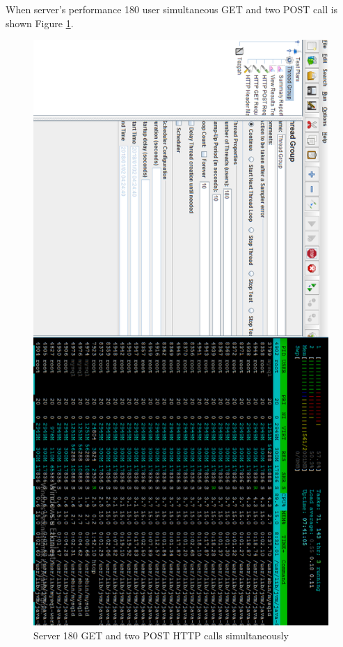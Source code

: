 \newpage


When server's performance 180 user simultaneous GET and two POST call is shown Figure
\ref{fig:180user}.

\begin{figure}[!htbp]
\centering
\includegraphics[width=\textwidth]{projectChapters/images/180user.png}
\caption{Server 180 GET and two POST HTTP calls simultaneously}
\label{fig:180user}
\end{figure}


